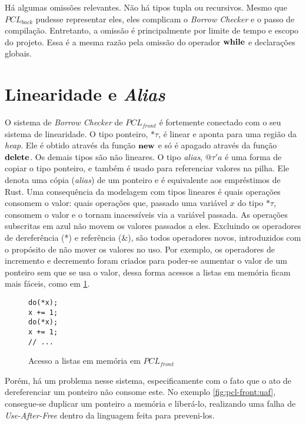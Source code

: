 Há algumas omissões relevantes. Não há tipos tupla ou recursivos. Mesmo que $PCL_{back}$ pudesse representar eles, eles complicam o \emph{Borrow Checker} e o passo de compilação. Entretanto, a omissão é principalmente por limite de tempo e escopo do projeto. Essa é a mesma razão pela omissão do operador $\mathbf{while}$ e declarações globais.


\section{Linearidade e \emph{Alias}}

O sistema de \emph{Borrow Checker} de $PCL_{front}$ é fortemente conectado com o seu sistema de linearidade. O tipo ponteiro, $\text{*}\tau$, é linear e aponta para uma região da \emph{heap}. Ele é obtido através da função $\mathbf{new}$ e só é apagado através da função $\mathbf{delete}$. Os demais tipos são não lineares. O tipo \emph{alias}, $@\tau'a$ é uma forma de copiar o tipo ponteiro, e também é usado para referenciar valores na pilha. Ele denota uma cópia (\emph{alias}) de um ponteiro e é equivalente aos empréstimos de Rust. Uma consequência da modelagem com tipos lineares é quais operações consomem o valor: quais operações que, passado uma variável $x$ do tipo $\text{*}\!\tau$, consomem o valor e o tornam inacessíveis via a variável passada. As operações subscritas em azul não movem os valores passados a eles. Excluindo os operadores de dereferência (*) e referência (\&), são todos operadores novos, introduzidos com o propósito de não mover os valores no uso. Por exemplo, os operadores de incremento e decremento foram criados para poder-se aumentar o valor de um ponteiro sem que se usa o valor, dessa forma acessos a listas em memória ficam mais fáceis, como em \ref{fig:pcl-front:inc}.

\begin{figure}[ht]
	\caption{Acesso a listas em memória em $PCL_{front}$}
	\label{fig:pcl-front:inc}
	\begin{lstlisting}[language=PCLfront]
do(*x);
x += 1;
do(*x);
x += 1;
// ...
	\end{lstlisting}
\end{figure}

Porém, há um problema nesse sistema, especificamente com o fato que o ato de dereferenciar um ponteiro não consome este. No exemplo \ref{fig:pcl-front:uaf}, consegue-se duplicar um ponteiro a memória e liberá-lo, realizando uma falha de \emph{Use-After-Free} dentro da linguagem feita para preveni-los.

